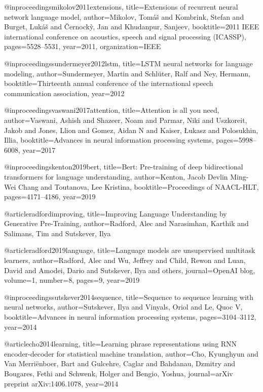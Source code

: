 @inproceedings{mikolov2011extensions,
  title={Extensions of recurrent neural network language model},
  author={Mikolov, Tom{\'a}{\v{s}} and Kombrink, Stefan and Burget, Luk{\'a}{\v{s}} and {\v{C}}ernock{\`y}, Jan and Khudanpur, Sanjeev},
  booktitle={2011 IEEE international conference on acoustics, speech and signal processing (ICASSP)},
  pages={5528--5531},
  year={2011},
  organization={IEEE}
}

@inproceedings{sundermeyer2012lstm,
  title={LSTM neural networks for language modeling},
  author={Sundermeyer, Martin and Schl{\"u}ter, Ralf and Ney, Hermann},
  booktitle={Thirteenth annual conference of the international speech communication association},
  year={2012}
}

@inproceedings{vaswani2017attention,
  title={Attention is all you need},
  author={Vaswani, Ashish and Shazeer, Noam and Parmar, Niki and Uszkoreit, Jakob and Jones, Llion and Gomez, Aidan N and Kaiser, {\L}ukasz and Polosukhin, Illia},
  booktitle={Advances in neural information processing systems},
  pages={5998--6008},
  year={2017}
}


@inproceedings{kenton2019bert,
  title={Bert: Pre-training of deep bidirectional transformers for language understanding},
  author={Kenton, Jacob Devlin Ming-Wei Chang and Toutanova, Lee Kristina},
  booktitle={Proceedings of NAACL-HLT},
  pages={4171--4186},
  year={2019}
}

@article{radfordimproving,
  title={Improving Language Understanding by Generative Pre-Training},
  author={Radford, Alec and Narasimhan, Karthik and Salimans, Tim and Sutskever, Ilya}
}


@article{radford2019language,
  title={Language models are unsupervised multitask learners},
  author={Radford, Alec and Wu, Jeffrey and Child, Rewon and Luan, David and Amodei, Dario and Sutskever, Ilya and others},
  journal={OpenAI blog},
  volume={1},
  number={8},
  pages={9},
  year={2019}
}


@inproceedings{sutskever2014sequence,
  title={Sequence to sequence learning with neural networks},
  author={Sutskever, Ilya and Vinyals, Oriol and Le, Quoc V},
  booktitle={Advances in neural information processing systems},
  pages={3104--3112},
  year={2014}
}

@article{cho2014learning,
  title={Learning phrase representations using RNN encoder-decoder for statistical machine translation},
  author={Cho, Kyunghyun and Van Merri{\"e}nboer, Bart and Gulcehre, Caglar and Bahdanau, Dzmitry and Bougares, Fethi and Schwenk, Holger and Bengio, Yoshua},
  journal={arXiv preprint arXiv:1406.1078},
  year={2014}
}

